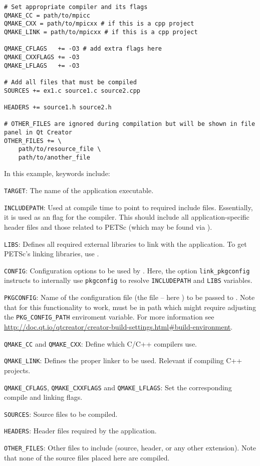 {{\begin{lstlisting}
# Set appropriate compiler and its flags
QMAKE_CC = path/to/mpicc
QMAKE_CXX = path/to/mpicxx # if this is a cpp project
QMAKE_LINK = path/to/mpicxx # if this is a cpp project

QMAKE_CFLAGS   += -O3 # add extra flags here
QMAKE_CXXFLAGS += -O3
QMAKE_LFLAGS   += -O3

# Add all files that must be compiled
SOURCES += ex1.c source1.c source2.cpp

HEADERS += source1.h source2.h

# OTHER_FILES are ignored during compilation but will be shown in file panel in Qt Creator
OTHER_FILES += \
	path/to/resource_file \
	path/to/another_file
\end{lstlisting}

In this example, keywords include:
\begin{tightitemize}
\item \lstinline{TARGET}: The name of the application executable.
\item \lstinline{INCLUDEPATH}: Used at compile time to point to required include files. Essentially, it is used as an  flag for the compiler. This should include all application-specific header files and those related to PETSc (which may be found via ).
\item \lstinline{LIBS}: Defines all required external libraries to link with the application. To get PETSc's linking libraries, use .
\item \lstinline{CONFIG}: Configuration options to be used by \trl{qmake}. Here, the option \lstinline{link_pkgconfig} instructs \trl{qmake} to internally 
  use \lstinline{pkgconfig} to resolve \lstinline{INCLUDEPATH} and \lstinline{LIBS} variables.
\item \lstinline{PKGCONFIG}: Name of the configuration file (the \trl{.pc} file -- here ) to be passed to \trl{pkgconfig}. Note that for this functionality to work, \trl{PETSc.pc} must be in path which might require adjusting the \lstinline{PKG_CONFIG_PATH} enviroment variable. 
  For more information see \url{http://doc.qt.io/qtcreator/creator-build-settings.html#build-environment}.
\item \lstinline{QMAKE_CC} and \lstinline{QMAKE_CXX}: Define which C/C++ compilers use.
\item \lstinline{QMAKE_LINK}: Defines the proper linker to be used. Relevant if compiling C++ projects.
\item \lstinline{QMAKE_CFLAGS}, \lstinline{QMAKE_CXXFLAGS} and \lstinline{QMAKE_LFLAGS}: Set the corresponding compile and linking flags.
\item \lstinline{SOURCES}: Source files to be compiled.
\item \lstinline{HEADERS}: Header files required by the application. 
\item \lstinline{OTHER_FILES}: Other files to include (source, header, or any other extension). Note that none of the source files placed here are compiled.
\end{tightitemize}

}}
